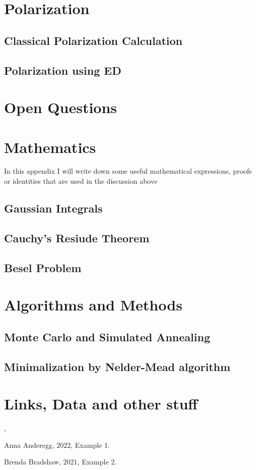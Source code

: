 \section{Polarization}
	\subsection{Classical Polarization Calculation}
	\subsection{Polarization using ED}

\section{Open Questions}
	
\appendix
\section{Mathematics}
	In this appendix I will write down some useful mathematical expressions, proofs or identities that are used in the discussion above
		\subsection{Gaussian Integrals}
			
		\subsection{Cauchy's Resiude Theorem}\label{CRT}
		\subsection{Besel Problem}
			
		
\section{Algorithms and Methods}
		\subsection{Monte Carlo and Simulated Annealing}
		\subsection{Minimalization by Nelder-Mead algorithm}

\section{Links, Data and other stuff}	



\cite{aa}, \cite{bb}

\newpage
\begin{thebibliography}{3}

 Anna Anderegg, 2022, Example 1.

 Brenda Bradshaw, 2021, Example 2.

\end{thebibliography}

